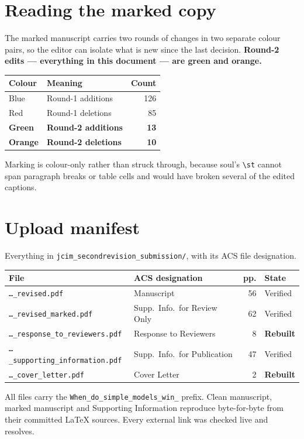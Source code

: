 \documentclass[11pt]{article}
\begin{document}
\section{Reading the marked copy}
The marked manuscript carries two rounds of changes in two separate colour pairs, so the editor can isolate
what is new since the last decision. \textbf{Round-2 edits --- everything in this document --- are green and
orange.}

\vspace{-0.3em}
\begin{center}
\begin{tabular}{@{}llr@{}}
\toprule
\textbf{Colour} & \textbf{Meaning} & \textbf{Count} \\
\midrule
Blue & Round-1 additions & 126 \\
Red & Round-1 deletions & 85 \\
\textbf{Green} & \textbf{Round-2 additions} & \textbf{13} \\
\textbf{Orange} & \textbf{Round-2 deletions} & \textbf{10} \\
\bottomrule
\end{tabular}
\end{center}

Marking is colour-only rather than struck through, because soul's \texttt{\textbackslash st} cannot span
paragraph breaks or table cells and would have broken several of the edited captions.

\section{Upload manifest}
{\small\color{inkmute} Everything in \texttt{jcim\_secondrevision\_submission/}, with its ACS file designation.}

\vspace{-0.3em}
\begin{center}
{\small
\begin{tabular}{@{}p{6.3cm}p{4.6cm}r l@{}}
\toprule
\textbf{File} & \textbf{ACS designation} & \textbf{pp.} & \textbf{State} \\
\midrule
\texttt{\ldots\_revised.pdf} & Manuscript & 56 & Verified \\
\texttt{\ldots\_revised\_marked.pdf} & Supp.\ Info.\ for Review Only & 62 & Verified \\
\texttt{\ldots\_response\_to\_reviewers.pdf} & Response to Reviewers & 8 & \textbf{Rebuilt} \\
\texttt{\ldots\_supporting\_information.pdf} & Supp.\ Info.\ for Publication & 47 & Verified \\
\texttt{\ldots\_cover\_letter.pdf} & Cover Letter & 2 & \textbf{Rebuilt} \\
\bottomrule
\end{tabular}}
\end{center}

{\footnotesize\color{inkmute}
All files carry the \texttt{When\_do\_simple\_models\_win\_} prefix. Clean manuscript, marked manuscript and
Supporting Information reproduce byte-for-byte from their committed \LaTeX{} sources. Every external link
was checked live and resolves.}
\end{document}

